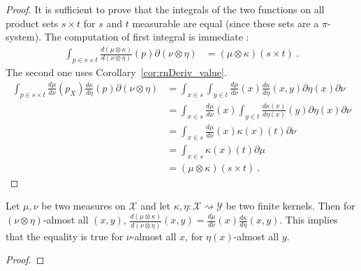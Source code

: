 \begin{proof}
It is sufficient to prove that the integrals of the two functions on all product sets $s \times t$ for $s$ and $t$ measurable are equal (since these sets are a $\pi$-system). The computation of first integral is immediate :
\begin{align*}
\int_{p \in s \times t}\frac{d (\mu \otimes \kappa)}{d (\nu \otimes \eta)}(p) \partial(\nu \otimes \eta)
&= (\mu \otimes \kappa)(s \times t)
\: .
\end{align*}
The second one uses Corollary~\ref{cor:rnDeriv_value}.
\begin{align*}
\int_{p \in s \times t}\frac{d\mu}{d\nu}(p_X) \frac{d \kappa}{d \eta}(p) \partial(\nu \otimes \eta)
&= \int_{x \in s} \int_{y \in t} \frac{d\mu}{d\nu}(x) \frac{d \kappa}{d \eta}(x,y) \partial\eta(x) \partial\nu
\\
&= \int_{x \in s} \frac{d\mu}{d\nu}(x) \int_{y \in t} \frac{d \kappa(x)}{d \eta(x)}(y) \partial\eta(x) \partial\nu
\\
&= \int_{x \in s} \frac{d\mu}{d\nu}(x) \kappa(x)(t) \partial\nu
\\
&= \int_{x \in s} \kappa(x)(t) \partial\mu
\\
&= (\mu \otimes \kappa)(s \times t)
\: .
\end{align*}
\end{proof}

\begin{lemma}
  \label{lem:rnDeriv_compProd}
  Let $\mu, \nu$ be two measures on $\mathcal X$ and let $\kappa, \eta : \mathcal X \rightsquigarrow \mathcal Y$ be two finite kernels. Then for $(\nu \otimes \eta)$-almost all $(x, y)$, $\frac{d (\mu \otimes \kappa)}{d (\nu \otimes \eta)}(x,y) = \frac{d\mu}{d\nu}(x)\frac{d \kappa}{d \eta}(x,y)$.
  This implies that the equality is true for $\nu$-almost all $x$, for $\eta(x)$-almost all $y$.
\end{lemma}

\begin{proof}
\end{proof}